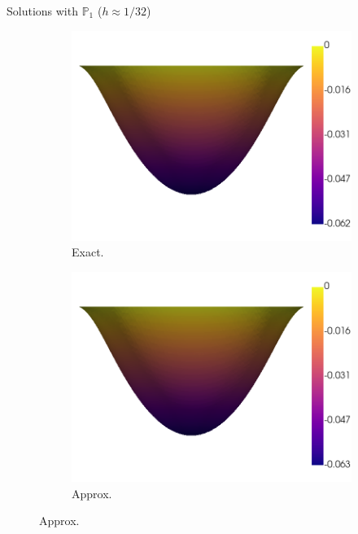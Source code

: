 	\begin{frame}{Solutions with $\mathbb{P}_1$ ($h\approx 1/32$)}
		\begin{figure}[h!]
			\begin{subfigure}{0.49\textwidth}
				\centering
				\includegraphics[scale=0.2]{img/Difusion/diff_u_ex_nx-32.png}
				\caption{Exact.}
			\end{subfigure}
			\begin{subfigure}{0.49\textwidth}
				\centering
				\includegraphics[scale=0.2]{img/Difusion/diff_u_FE_nx-32.png}
				\caption{Approx.}
			\end{subfigure}
		\end{figure}
	\end{frame}

